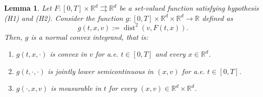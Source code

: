\documentclass[11pt]{elsarticle}
\newtheorem{lemma}[theorem]{Lemma}
\theoremstyle{definition}
\theoremstyle{remark}
\numberwithin{equation}{section}
\begin{document}
	\begin{lemma}\label{lem:normal-integrand}
		Let $F:[0,T]\times\mathbb{R}^d\rightrightarrows\mathbb{R}^d$ be a set-valued function satisfying hypothesis \textup{(H1)} and \textup{(H2)}.
		Consider the function $g:[0,T]\times \mathbb{R}^d \times \mathbb{R}^d \to \mathbb{R}$ defined as
		\[
		g(t, x, v) := \operatorname{dist}^2(v, F(t, x)).
		\]
		Then, $g$ is a normal convex integrand, that is:
		\begin{enumerate}
			\item $g(t, x, \cdot)$ is convex in $v$ for a.e. $t \in [0,T]$ and every $x\in\mathbb{R}^d$.
			\item $g(t, \cdot, \cdot)$ is jointly lower semicontinuous in $(x, v)$ for a.e. $t \in [0,T]$.
			\item $g(\cdot, x, v)$ is measurable in $t$ for every $(x,v)\in\mathbb{R}^d\times\mathbb{R}^d$.
		\end{enumerate}
	\end{lemma}
\end{document}
